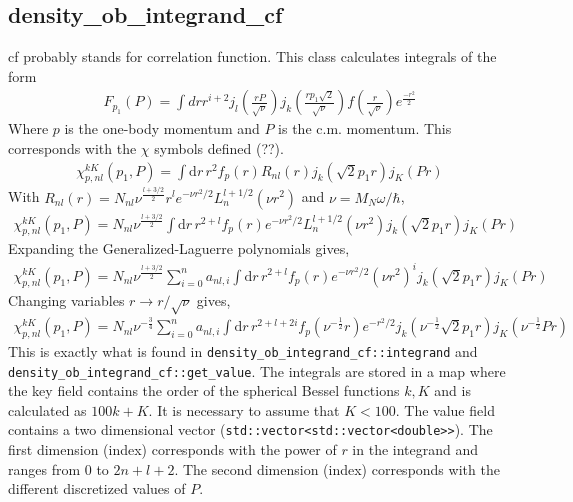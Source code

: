\documentclass[10pt]{article}
\begin{document}
\subsection{ density\_ob\_integrand\_cf }
cf probably stands for correlation function. This class calculates integrals of the form
\begin{align*}
F_{p_1}(P) = \int dr r^{i+2} j_l(\frac{rP}{\sqrt{\nu}})  j_k(\frac{r p_1\sqrt{2}}{\sqrt{\nu}} )  f(\frac{r}{\sqrt{\nu}})  e^{\frac{-r^2}{2}}
\end{align*}
Where $p$ is the one-body momentum and $P$ is the c.m. momentum. This corresponds with the $\chi$ symbols defined (??).
\begin{align*}
	\chi_{p,nl}^{kK}(p_1,P) = \int \text{d} r\, r^{2} f_{p}(r) R_{n l}(r) j_{k}( \sqrt{2} p_1 r)  j_{K}(P r)
\end{align*}
With  $R_{nl}(r) = N_{nl} \nu^{\frac{l + 3/2}{2}} r^{l} e^{-\nu r^{2} /2} L_{n}^{l+1/2}(\nu r^{2})$ and $ \nu = M_N \omega / \hbar $,
\begin{align*}
	\chi_{p,nl}^{kK}(p_1,P) = N_{nl} \nu^{\frac{l + 3/2}{2}} \int \text{d} r\, r^{2+l} f_{p}(r)  e^{-\nu r^{2} /2} L_{n}^{l+1/2}(\nu r^{2}) j_{k}( \sqrt{2} p_1 r)  j_{K}(P r)
\end{align*}
Expanding the Generalized-Laguerre polynomials gives,
\begin{align*}
	\chi_{p,nl}^{kK}(p_1,P) = N_{nl} \nu^{\frac{l + 3/2}{2}} \sum_{i=0}^{n} a_{nl,i} \int \text{d} r\, r^{2+l} f_{p}(r)  e^{-\nu r^{2} /2}  (\nu r^{2})^{i} j_{k}( \sqrt{2} p_1 r)  j_{K}(P r)
\end{align*}
Changing variables $ r \rightarrow r/\sqrt{\nu}$ gives,
\begin{align*}
	\chi_{p,nl}^{kK}(p_1,P) =  N_{nl} \nu^{-\frac{3}{4}} \sum_{i=0}^{n} a_{nl,i} \int \text{d} r\, r^{2+l+2i} f_{p}( \nu^{-\frac{1}{2}} r)  e^{-r^{2} /2} j_{k}( \nu^{-\frac{1}{2}} \sqrt{2} p_1 r)  j_{K}(\nu^{-\frac{1}{2}} P r)
\end{align*}
This is exactly what is found in \texttt{density\_ob\_integrand\_cf::integrand} and \\ \texttt{density\_ob\_integrand\_cf::get\_value}.
The integrals are stored in a map where the key field contains the order of the spherical Bessel functions $k,K$ and is calculated as $100k+K$. It is necessary to assume that $ K < 100$.
The value field contains a two dimensional vector (\texttt{std::vector<std::vector<double>>}).
The first dimension (index) corresponds with the power of $r$ in the integrand and ranges from $0$ to $2n+l+2$.
The second dimension (index) corresponds with the different discretized values of $P$.
\end{document}
